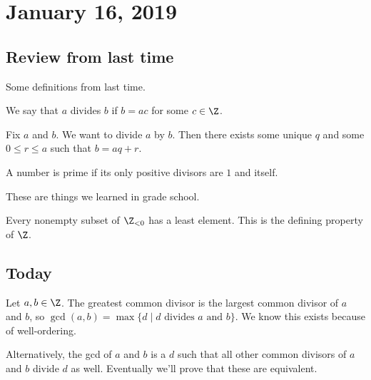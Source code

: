 
\section{January 16, 2019}

\subsection{Review from last time}
Some definitions from last time.

\begin{definition}[Divisibility]
We say that $a$ divides $b$ if $b = ac$ for some $c \in \Z$.
\end{definition}

\begin{definition}
Fix $a$ and $b$. We want to divide $a$ by $b$. Then there exists some unique $q$ and some $0 \leq r \leq a$ such that $b = aq + r$.
\end{definition}

\begin{definition}[Prime]
A number is prime if its only positive divisors are $1$ and itself.
\end{definition}

These are things we learned in grade school.

\begin{theorem}
Every nonempty subset of $\Z_{<0}$ has a least element. This is the defining property of $\Z$.
\end{theorem}

\subsection{Today}

\begin{definition}[GCD]
Let $a,b \in \Z$. The greatest common divisor is the largest common divisor of $a$ and $b$, so $\gcd(a,b) = \max\{d \mid \text{$d$ divides $a$ and $b$}\}$. We know this exists because of well-ordering.
\end{definition}

\begin{definition}[GCD]
Alternatively, the gcd of $a$ and $b$ is a $d$ such that all other common divisors of $a$ and $b$ divide $d$ as well. Eventually we'll prove that these are equivalent.
\end{definition}

